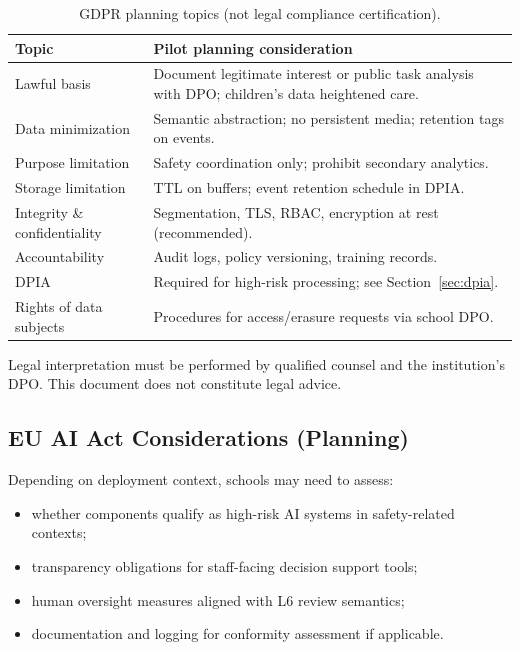 \begin{table}[htbp]
  \centering
  \caption{GDPR planning topics (not legal compliance certification).}
  \label{tab:gdpr-topics}
  \small
  \begin{tabular}{@{}p{3.4cm}p{8.6cm}@{}}
    \toprule
    Topic & Pilot planning consideration \\
    \midrule
    Lawful basis &
      Document legitimate interest or public task analysis with DPO; children's data heightened care. \\
    Data minimization &
      Semantic abstraction; no persistent media; retention tags on events. \\
    Purpose limitation &
      Safety coordination only; prohibit secondary analytics. \\
    Storage limitation &
      TTL on buffers; event retention schedule in DPIA. \\
    Integrity \& confidentiality &
      Segmentation, TLS, RBAC, encryption at rest (recommended). \\
    Accountability &
      Audit logs, policy versioning, training records. \\
    DPIA &
      Required for high-risk processing; see Section~\ref{sec:dpia}. \\
    Rights of data subjects &
      Procedures for access/erasure requests via school DPO. \\
    \bottomrule
  \end{tabular}
\end{table}

Legal interpretation must be performed by qualified counsel and the institution's DPO.
This document does not constitute legal advice.

\subsection{EU AI Act Considerations (Planning)}

Depending on deployment context, schools may need to assess:
\begin{itemize}[noitemsep]
  \item whether components qualify as high-risk AI systems in safety-related contexts;
  \item transparency obligations for staff-facing decision support tools;
  \item human oversight measures aligned with L6 review semantics;
  \item documentation and logging for conformity assessment if applicable.
\end{itemize}


